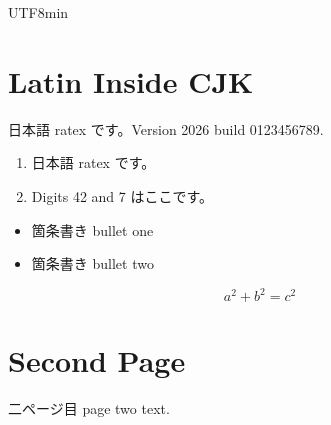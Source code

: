 \documentclass{article}
\begin{document}
\begin{CJK}{UTF8}{min}
\tableofcontents

\section{Latin Inside CJK}
日本語 ratex です。Version 2026 build 0123456789.

\begin{enumerate}
  \item 日本語 ratex です。
  \item Digits 42 and 7 はここです。
\end{enumerate}

\begin{itemize}
  \item 箇条書き bullet one
  \item 箇条書き bullet two
\end{itemize}

\begin{equation}
  a^2 + b^2 = c^2
\end{equation}

\newpage
\section{Second Page}
二ページ目 page two text.
\end{CJK}
\end{document}
